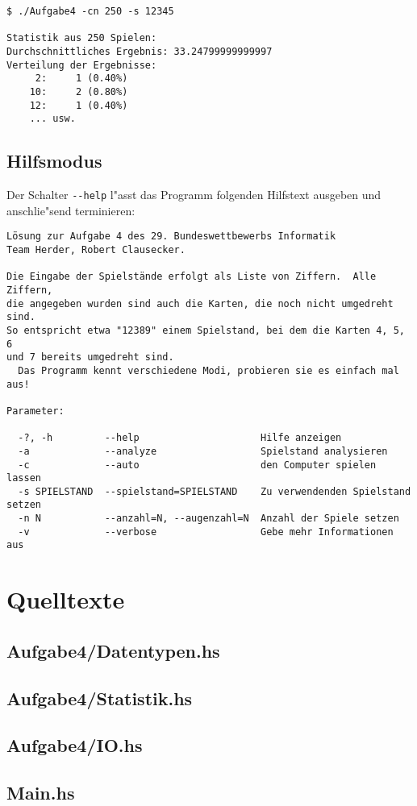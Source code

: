 \documentclass{scrreprt}
\begin{document}
\begin{verbatim}
$ ./Aufgabe4 -cn 250 -s 12345

Statistik aus 250 Spielen:
Durchschnittliches Ergebnis: 33.24799999999997
Verteilung der Ergebnisse:
	 2:     1 (0.40%)
	10:     2 (0.80%)
	12:     1 (0.40%)
    ... usw.
\end{verbatim}

\section{Hilfsmodus}
Der Schalter \texttt{-\/-help} l"asst das Programm folgenden Hilfstext ausgeben
und anschlie"send terminieren:

\begin{verbatim}
Lösung zur Aufgabe 4 des 29. Bundeswettbewerbs Informatik
Team Herder, Robert Clausecker.

Die Eingabe der Spielstände erfolgt als Liste von Ziffern.  Alle Ziffern,
die angegeben wurden sind auch die Karten, die noch nicht umgedreht sind.
So entspricht etwa "12389" einem Spielstand, bei dem die Karten 4, 5, 6
und 7 bereits umgedreht sind.
  Das Programm kennt verschiedene Modi, probieren sie es einfach mal aus!

Parameter:

  -?, -h         --help                     Hilfe anzeigen
  -a             --analyze                  Spielstand analysieren
  -c             --auto                     den Computer spielen lassen
  -s SPIELSTAND  --spielstand=SPIELSTAND    Zu verwendenden Spielstand setzen
  -n N           --anzahl=N, --augenzahl=N  Anzahl der Spiele setzen
  -v             --verbose                  Gebe mehr Informationen aus
\end{verbatim}

\chapter{Quelltexte}

\section{Aufgabe4/Datentypen.hs}


\section{Aufgabe4/Statistik.hs}


\section{Aufgabe4/IO.hs}


\section{Main.hs}

\end{document}
